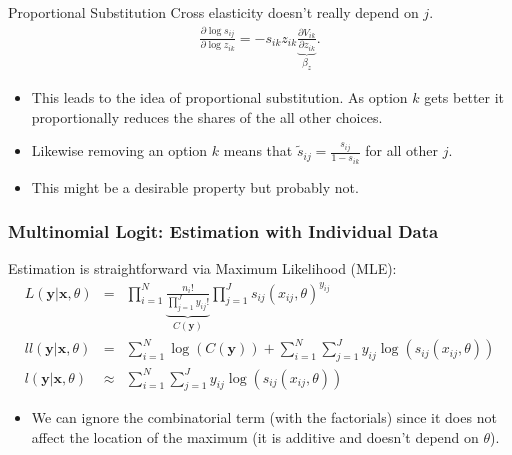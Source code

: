 \documentclass[xcolor=pdftex,dvipsnames,table,mathserif]{beamer}
\begin{document}
\begin{frame}{Proportional Substitution}
Cross elasticity doesn't really depend on $j$.
\begin{eqnarray*}
\frac{ \partial \log s_{ij}}{ \partial \log z_{ik}} = -s_{ik} z_{ik} \underbrace{\frac{\partial V_{ik}}{\partial z_{ik}}}_{\beta_z}.
\end{eqnarray*}
\begin{itemize}
\item This leads to the idea of proportional substitution. As option $k$ gets better it proportionally reduces the shares of the all other choices.
\item Likewise removing an option $k$ means that $\tilde{s}_{ij} = \frac{s_{ij}}{1-s_{ik}}$ for all other $j$.
\item This might be a desirable property but probably not.
\end{itemize}
\end{frame}





\begin{frame}
\frametitle{Multinomial Logit: Estimation with Individual Data}
Estimation is straightforward via Maximum Likelihood (MLE):
\begin{eqnarray*}
L(\mathbf{y} | \mathbf{x}, \theta) &=& \prod_{i=1}^N  \underbrace{\frac{n_i!}{\prod_{j=1}^J y_{ij}!}}_{C(\mathbf{y})} \prod_{j=1}^J  s_{ij}(x_{ij},\theta)^{y_{ij}} \\
ll(\mathbf{y} | \mathbf{x}, \theta) &=& \sum_{i=1}^N \log(C(\mathbf{y}))   + \sum_{i=1}^N \sum_{j=1}^J y_{ij} \log( s_{ij}(x_{ij},\theta)) \\
l(\mathbf{y} | \mathbf{x}, \theta) &\approx& \sum_{i=1}^N \sum_{j=1}^J y_{ij} \log( s_{ij}(x_{ij},\theta))
\end{eqnarray*}
\begin{itemize}
\item We can ignore the combinatorial term (with the factorials) since it does not affect the location of the maximum (it is additive and doesn't depend on $\theta$).
\end{itemize}
\end{frame}
\end{document}
